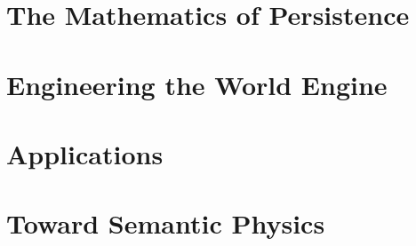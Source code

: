 \documentclass[11pt,oneside]{book}
\begin{document}
\part{The Mathematics of Persistence}








\part{Engineering the World Engine}







\part{Applications}







\part{Toward Semantic Physics}







\appendix






\end{document}
